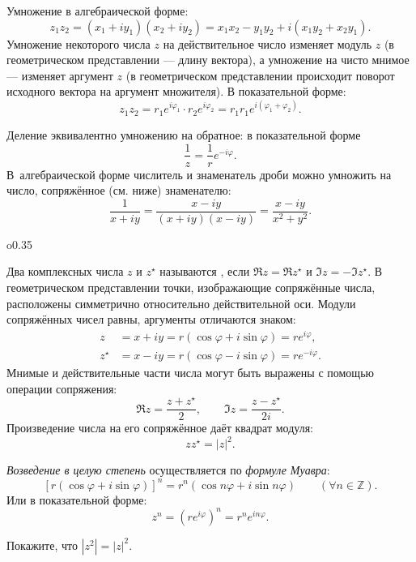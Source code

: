 \begin{booksupplement}
    Умножение в алгебраической форме:
    \[
     z_1 z_2 = (x_1 +iy_1)(x_2 + iy_2) = x_1 x_2 - y_1 y_2 + i(x_1y_2 + x_2 y_1).
    \]
    Умножение некоторого числа $z$ на действительное число изменяет модуль
    $z$ (в геометрическом представлении --- длину вектора), а умножение
    на чисто мнимое --- изменяет аргумент $z$ (в геометрическом представлении
    происходит поворот исходного вектора на аргумент множителя). В показательной форме:
    \[
     z_1 z_2 = r_1 e^{i\varphi_1} \cdot r_2 e^{i\varphi_2} = r_1r_1 e^{i(\varphi_1+\varphi_2)}.
    \]


    Деление эквивалентно умножению на обратное: в показательной
    форме
    \[
      \frac{1}{z} = \frac{1}{r} e^{-i\varphi}.
    \]
 В~алгебраической форме числитель и знаменатель дроби можно умножить на число,
 сопряжённое (см. ниже) знаменателю:
    \[
     \frac{1}{x+iy} = \frac{x-iy}{(x+iy)(x-iy)}=\frac{x-iy}{x^2+y^2}.
    \]

    \begin{wrapfigure}[9]{o}{0.35\textwidth}
    \end{wrapfigure}

    Два комплексных числа $z$ и $z^{\star}$ называются
    , если
    $\Re z = \Re z^{\star}$ и $\Im z = - \Im z^{\star}$. В геометрическом
    представлении точки, изображающие сопряжённые числа, расположены симметрично
    относительно действительной оси. Модули сопряжённых чисел
    равны, аргументы отличаются знаком:
    \begin{equation*}
    \begin{aligned}
        z &= x + iy = r(\cos\varphi + i\sin\varphi) = re^{i\varphi}, \\
        z^{\star} &= x - iy = r(\cos\varphi - i\sin\varphi) = re^{- i\varphi}.
    \end{aligned}
    \end{equation*}
    Мнимые и действительные части числа могут быть выражены с помощью
    операции сопряжения:
    \[
     \Re z = \frac{z+z^{\star}}{2},\qquad \Im z =\frac{z-z^{\star}}{2i}.
    \]
    Произведение числа на его сопряжённое даёт квадрат модуля:
    \[
     z z^{\star} = |z|^2.
    \]

    \emph{Возведение в целую степень} осуществляется по \emph{формуле Муавра}:
      \begin{equation*}
        \left[r(\cos\varphi + i\sin\varphi)\right]^{n} =
        r^{n}(\cos n\varphi + i\sin n\varphi)\qquad (\forall n\in \mathbb{Z}).
    \end{equation*}
    Или в показательной форме:
    \[
     z^n = (re^{i\varphi})^n = r^n e^{in\varphi}.
    \]
    \begin{lab:exercise}
     Покажите, что $|z^2| = |z|^2$.
    \end{lab:exercise}


\end{booksupplement}
